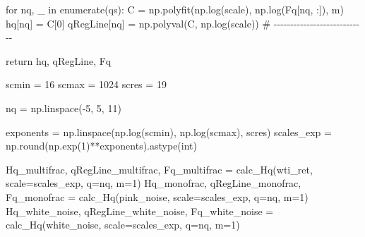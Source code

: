 \documentclass[
  letterpaper,
]{report}
\newenvironment{Shaded}{\begin{snugshade}}{\end{snugshade}}
\newcommand{\BuiltInTok}[1]{\textcolor[rgb]{0.00,0.23,0.31}{#1}}
\newcommand{\CommentTok}[1]{\textcolor[rgb]{0.37,0.37,0.37}{#1}}
\newcommand{\ControlFlowTok}[1]{\textcolor[rgb]{0.00,0.23,0.31}{#1}}
\newcommand{\DecValTok}[1]{\textcolor[rgb]{0.68,0.00,0.00}{#1}}
\newcommand{\KeywordTok}[1]{\textcolor[rgb]{0.00,0.23,0.31}{#1}}
\newcommand{\NormalTok}[1]{\textcolor[rgb]{0.00,0.23,0.31}{#1}}
\newcommand{\OperatorTok}[1]{\textcolor[rgb]{0.37,0.37,0.37}{#1}}
\begin{document}
\begin{Shaded}
\begin{Highlighting}[]
        \ControlFlowTok{for}\NormalTok{ nq, \_ }\KeywordTok{in} \BuiltInTok{enumerate}\NormalTok{(qs): }
\NormalTok{            C }\OperatorTok{=}\NormalTok{ np.polyfit(np.log(scale), np.log(Fq[nq, :]), m)}
\NormalTok{            hq[nq] }\OperatorTok{=}\NormalTok{ C[}\DecValTok{0}\NormalTok{]}
\NormalTok{            qRegLine[nq] }\OperatorTok{=}\NormalTok{ np.polyval(C, np.log(scale))}
        \CommentTok{\# {-}{-}{-}{-}{-}{-}{-}{-}{-}{-}{-}{-}{-}{-}{-}{-}{-}{-}{-}{-}{-}{-}{-}{-}{-}{-}{-}{-}}

    \ControlFlowTok{return}\NormalTok{ hq, qRegLine, Fq }
\end{Highlighting}
\end{Shaded}

\begin{Shaded}
\begin{Highlighting}[]
\NormalTok{scmin }\OperatorTok{=} \DecValTok{16}
\NormalTok{scmax }\OperatorTok{=} \DecValTok{1024}
\NormalTok{scres }\OperatorTok{=} \DecValTok{19}

\NormalTok{nq }\OperatorTok{=}\NormalTok{ np.linspace(}\OperatorTok{{-}}\DecValTok{5}\NormalTok{, }\DecValTok{5}\NormalTok{, }\DecValTok{11}\NormalTok{)}

\NormalTok{exponents }\OperatorTok{=}\NormalTok{ np.linspace(np.log(scmin), np.log(scmax), scres)}
\NormalTok{scales\_exp }\OperatorTok{=}\NormalTok{ np.}\BuiltInTok{round}\NormalTok{(np.exp(}\DecValTok{1}\NormalTok{)}\OperatorTok{**}\NormalTok{exponents).astype(}\BuiltInTok{int}\NormalTok{)}

\NormalTok{Hq\_multifrac, qRegLine\_multifrac, Fq\_multifrac }\OperatorTok{=}\NormalTok{ calc\_Hq(wti\_ret, scale}\OperatorTok{=}\NormalTok{scales\_exp, q}\OperatorTok{=}\NormalTok{nq, m}\OperatorTok{=}\DecValTok{1}\NormalTok{)}
\NormalTok{Hq\_monofrac, qRegLine\_monofrac, Fq\_monofrac }\OperatorTok{=}\NormalTok{ calc\_Hq(pink\_noise, scale}\OperatorTok{=}\NormalTok{scales\_exp, q}\OperatorTok{=}\NormalTok{nq, m}\OperatorTok{=}\DecValTok{1}\NormalTok{)}
\NormalTok{Hq\_white\_noise, qRegLine\_white\_noise, Fq\_white\_noise }\OperatorTok{=}\NormalTok{ calc\_Hq(white\_noise, scale}\OperatorTok{=}\NormalTok{scales\_exp, q}\OperatorTok{=}\NormalTok{nq, m}\OperatorTok{=}\DecValTok{1}\NormalTok{)}
\end{Highlighting}
\end{Shaded}
\end{document}
